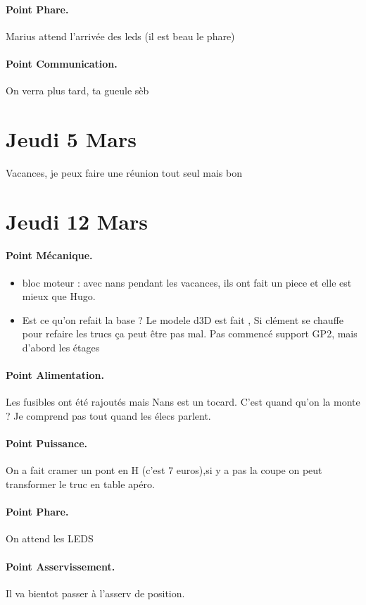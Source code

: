 \documentclass[a4paper,10pt]{report}
\begin{document}
\begin{spacing}{1.5}
\paragraph{Point Phare.} Marius attend l'arrivée des leds (il est beau le phare)
\paragraph{Point Communication.} On verra plus tard, \og ta gueule sèb\fg{}

\newpage
\section*{Jeudi 5 Mars}
Vacances, je peux faire une réunion tout seul mais bon

\newpage
\section*{Jeudi 12 Mars}
\paragraph{Point Mécanique.}
\begin{itemize}
  \item bloc moteur : avec nans pendant les vacances, ils ont fait un piece et
  elle est mieux que Hugo.
  \item Est ce qu'on refait la base ? Le modele d3D est fait , Si clément se
  chauffe pour refaire les trucs ça peut être pas mal. Pas commencé support GP2,
  mais d'abord les étages
\end{itemize}
\paragraph{Point Alimentation.}
Les fusibles ont été rajoutés mais Nans est un tocard. C'est quand qu'on la
monte ? Je comprend pas tout quand les élecs parlent.
\paragraph{Point Puissance.}
On a fait cramer un pont en H (c'est 7 euros),si y a pas la coupe on peut
transformer le truc en table apéro.
\paragraph{Point Phare.}
On attend les LEDS
\paragraph{Point Asservissement.}
Il va bientot passer à l'asserv de position.

\end{spacing}
\end{document}
